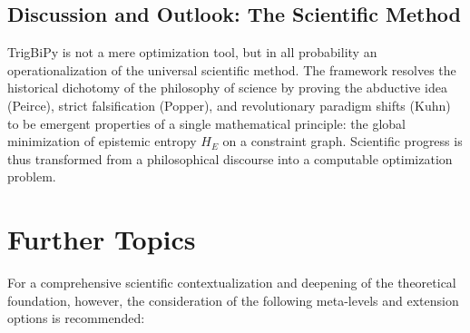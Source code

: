 \documentclass[11pt, a4paper]{article}
\begin{document}
	\subsection{Discussion and Outlook: The Scientific Method}
	
	TrigBiPy is not a mere optimization tool, but in all probability an operationalization of the universal scientific method. The framework resolves the historical dichotomy of the philosophy of science by proving the abductive idea (Peirce), strict falsification (Popper), and revolutionary paradigm shifts (Kuhn) to be emergent properties of a single mathematical principle: the global minimization of epistemic entropy $H_E$ on a constraint graph. Scientific progress is thus transformed from a philosophical discourse into a computable optimization problem.
	
	\section{Further Topics}
	For a comprehensive scientific contextualization and deepening of the theoretical foundation, however, the consideration of the following meta-levels and extension options is recommended:
	
\end{document}
